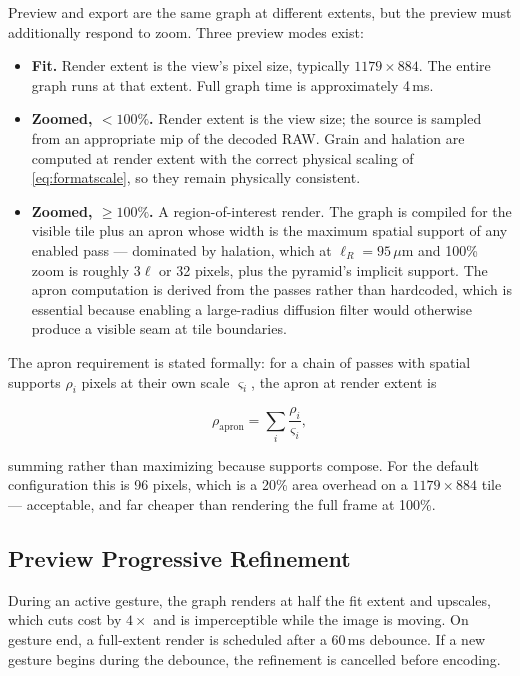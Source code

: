 Preview and export are the same graph at different extents, but the preview must
additionally respond to zoom. Three preview modes exist:

\begin{itemize}
\item \textbf{Fit.} Render extent is the view's pixel size, typically
$1179 \times 884$. The entire graph runs at that extent. Full graph time is
approximately 4\,ms.
\item \textbf{Zoomed, $< 100\%$.} Render extent is the view size; the source is
sampled from an appropriate mip of the decoded RAW. Grain and halation are
computed at render extent with the correct physical scaling of
\eqref{eq:formatscale}, so they remain physically consistent.
\item \textbf{Zoomed, $\geq 100\%$.} A region-of-interest render. The graph is
compiled for the visible tile plus an apron whose width is the maximum spatial
support of any enabled pass --- dominated by halation, which at
$\ell_R = 95\,\mu$m and 100\% zoom is roughly $3\ell$ or 32 pixels, plus the
pyramid's implicit support. The apron computation is derived from the passes
rather than hardcoded, which is essential because enabling a large-radius
diffusion filter would otherwise produce a visible seam at tile boundaries.
\end{itemize}

The apron requirement is stated formally: for a chain of passes with spatial
supports $\rho_i$ pixels at their own scale $\varsigma_i$, the apron at render
extent is

\begin{equation}
\rho_{\mathrm{apron}} = \sum_i \frac{\rho_i}{\varsigma_i},
\end{equation}

summing rather than maximizing because supports compose. For the default
configuration this is 96 pixels, which is a 20\% area overhead on a
$1179\times884$ tile --- acceptable, and far cheaper than rendering the full
frame at 100\%.

\subsection{Preview Progressive Refinement}

During an active gesture, the graph renders at half the fit extent and upscales,
which cuts cost by $4\times$ and is imperceptible while the image is moving. On
gesture end, a full-extent render is scheduled after a 60\,ms debounce. If a new
gesture begins during the debounce, the refinement is cancelled before
encoding.

